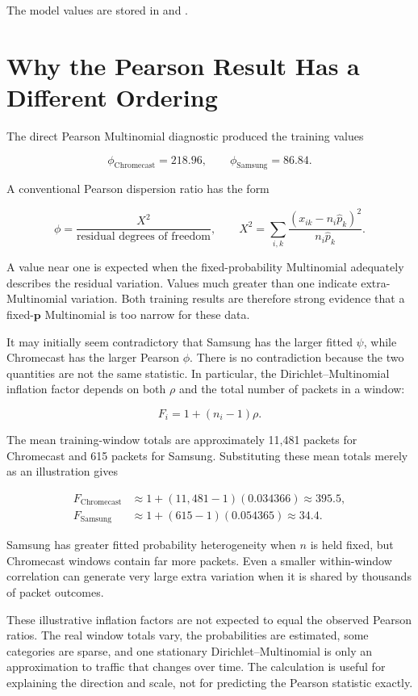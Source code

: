 \documentclass[11pt,a4paper]{article}
\begin{document}
The model values are stored in
 and
.

\section{Why the Pearson Result Has a Different Ordering}

The direct Pearson Multinomial diagnostic produced the training values

\[
\phi_{\mathrm{Chromecast}}=218.96,
\qquad
\phi_{\mathrm{Samsung}}=86.84.
\]

A conventional Pearson dispersion ratio has the form

\[
\phi=\frac{X^2}{\text{residual degrees of freedom}},
\qquad
X^2=
\sum_{i,k}
\frac{(x_{ik}-n_i\widehat{p}_k)^2}
     {n_i\widehat{p}_k}.
\]

A value near one is expected when the fixed-probability Multinomial adequately
describes the residual variation.  Values much greater than one indicate
extra-Multinomial variation.  Both training results are therefore strong
evidence that a fixed-$\mathbf{p}$ Multinomial is too narrow for these data.

It may initially seem contradictory that Samsung has the larger fitted
$\psi$, while Chromecast has the larger Pearson $\phi$.  There is no
contradiction because the two quantities are not the same statistic.  In
particular, the Dirichlet--Multinomial inflation factor depends on both
$\rho$ and the total number of packets in a window:

\[
F_i=1+(n_i-1)\rho.
\]

The mean training-window totals are approximately 11,481 packets for
Chromecast and 615 packets for Samsung.  Substituting these mean totals merely
as an illustration gives

\begin{align}
F_{\mathrm{Chromecast}}
  &\approx1+(11{,}481-1)(0.034366)
    \approx395.5,\\
F_{\mathrm{Samsung}}
  &\approx1+(615-1)(0.054365)
    \approx34.4.
\end{align}

Samsung has greater fitted probability heterogeneity when $n$ is held fixed,
but Chromecast windows contain far more packets.  Even a smaller
within-window correlation can generate very large extra variation when it is
shared by thousands of packet outcomes.

These illustrative inflation factors are not expected to equal the observed
Pearson ratios.  The real window totals vary, the probabilities are estimated,
some categories are sparse, and one stationary Dirichlet--Multinomial is only
an approximation to traffic that changes over time.  The calculation is
useful for explaining the direction and scale, not for predicting the Pearson
statistic exactly.
\end{document}
